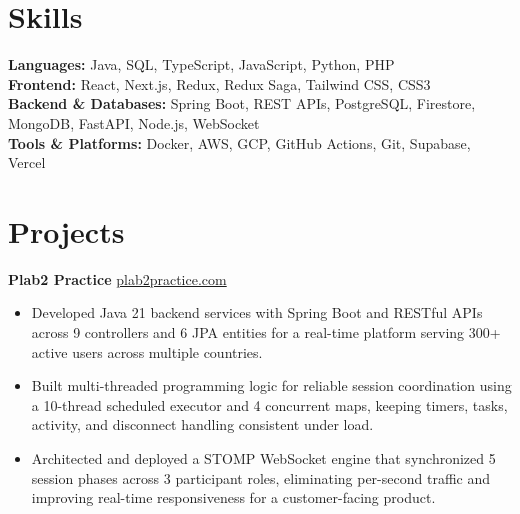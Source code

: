 \documentclass[11pt]{article}       %
\begin{document}
\vspace{-10.5pt}

\section*{Skills}
\textbf{Languages:} Java, SQL, TypeScript, JavaScript, Python, PHP \\
\textbf{Frontend:} React, Next.js, Redux, Redux Saga, Tailwind CSS, CSS3 \\
\textbf{Backend \& Databases:} Spring Boot, REST APIs, PostgreSQL, Firestore, MongoDB, FastAPI, Node.js, WebSocket \\
\textbf{Tools \& Platforms:} Docker, AWS, GCP, GitHub Actions, Git, Supabase, Vercel
\vspace{-5pt}






\section*{Projects}
\textbf{Plab2 Practice} \hfill \href{https://plab2practice.com}{plab2practice.com} \\
\vspace{-9pt}
\begin{itemize}
  \item Developed Java 21 backend services with Spring Boot and RESTful APIs across 9 controllers and 6 JPA entities for a real-time platform serving 300+ active users across multiple countries.
  \item Built multi-threaded programming logic for reliable session coordination using a 10-thread scheduled executor and 4 concurrent maps, keeping timers, tasks, activity, and disconnect handling consistent under load.
  \item Architected and deployed a STOMP WebSocket engine that synchronized 5 session phases across 3 participant roles, eliminating per-second traffic and improving real-time responsiveness for a customer-facing product.
\end{itemize}
\end{document}
